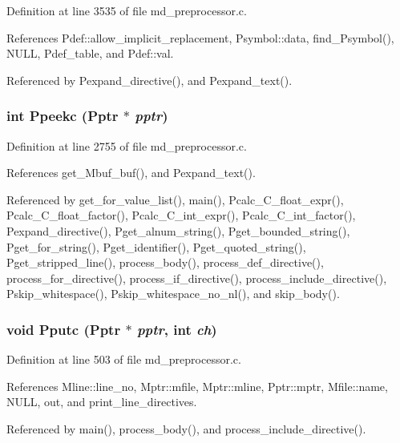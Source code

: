 Definition at line 3535 of file md\_\-preprocessor.c.

References Pdef::allow\_\-implicit\_\-replacement, Psymbol::data, find\_\-Psymbol(), NULL, Pdef\_\-table, and Pdef::val.

Referenced by Pexpand\_\-directive(), and Pexpand\_\-text().
\subsubsection{\setlength{\rightskip}{0pt plus 5cm}int Ppeekc (\bf{Pptr} $\ast$ {\em pptr})}\label{md__preprocessor_8c_5b05ec5cf990254459f0b332eb08b6cd}




Definition at line 2755 of file md\_\-preprocessor.c.

References get\_\-Mbuf\_\-buf(), and Pexpand\_\-text().

Referenced by get\_\-for\_\-value\_\-list(), main(), Pcalc\_\-C\_\-float\_\-expr(), Pcalc\_\-C\_\-float\_\-factor(), Pcalc\_\-C\_\-int\_\-expr(), Pcalc\_\-C\_\-int\_\-factor(), Pexpand\_\-directive(), Pget\_\-alnum\_\-string(), Pget\_\-bounded\_\-string(), Pget\_\-for\_\-string(), Pget\_\-identifier(), Pget\_\-quoted\_\-string(), Pget\_\-stripped\_\-line(), process\_\-body(), process\_\-def\_\-directive(), process\_\-for\_\-directive(), process\_\-if\_\-directive(), process\_\-include\_\-directive(), Pskip\_\-whitespace(), Pskip\_\-whitespace\_\-no\_\-nl(), and skip\_\-body().
\subsubsection{\setlength{\rightskip}{0pt plus 5cm}void Pputc (\bf{Pptr} $\ast$ {\em pptr}, int {\em ch})}\label{md__preprocessor_8c_d8d34f9d84875158116eecfd1f6a0c14}




Definition at line 503 of file md\_\-preprocessor.c.

References Mline::line\_\-no, Mptr::mfile, Mptr::mline, Pptr::mptr, Mfile::name, NULL, out, and print\_\-line\_\-directives.

Referenced by main(), process\_\-body(), and process\_\-include\_\-directive().
